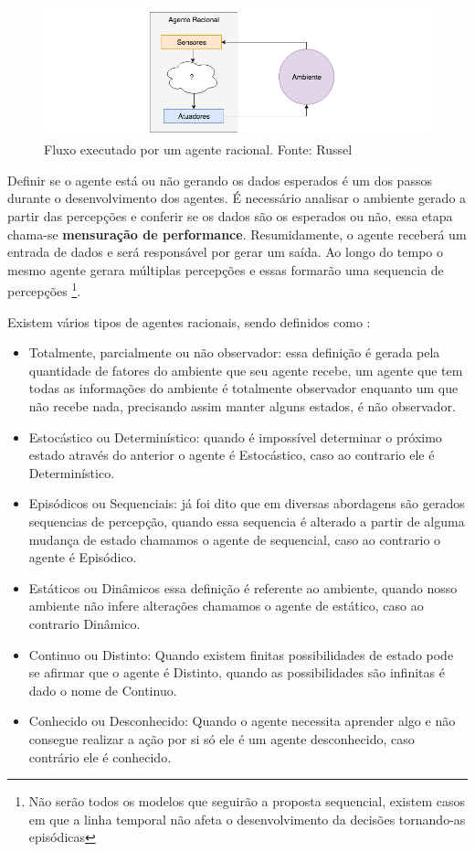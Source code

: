 \begin{figure}
    \centering
    \includegraphics[width=.8\textwidth]{imagens/rational_agent_draw.png}
    \caption{Fluxo executado por um agente racional. Fonte: Russel}
    \label{fig:rational_agent_draw}
\end{figure}

Definir se o agente está ou não gerando os dados esperados é um dos passos durante o desenvolvimento dos agentes. É necessário analisar o ambiente gerado a partir das percepções e conferir se os dados são os esperados ou não, essa etapa chama-se \textbf{mensuração de performance}. Resumidamente, o agente receberá um entrada de dados e será responsável por gerar um saída. Ao longo do tempo o mesmo agente gerara múltiplas percepções e essas formarão uma sequencia de percepções \footnote{Não serão todos os modelos que seguirão a proposta sequencial, existem casos em que a linha temporal não afeta o desenvolvimento da decisões tornando-as episódicas}.

Existem vários tipos de agentes racionais, sendo definidos como \cite[34-45]{russell2003artificial}:

\begin{itemize}
 \item Totalmente, parcialmente ou não observador: essa definição é gerada pela quantidade de fatores do ambiente que seu agente recebe, um agente que tem todas as informações do ambiente é totalmente observador enquanto um que não recebe nada, precisando assim manter alguns estados, é não observador.
 \item Estocástico ou Determinístico: quando é impossível determinar o próximo estado através do anterior o agente é Estocástico, caso ao contrario ele é Determinístico.
 \item Episódicos ou Sequenciais: já foi dito que em diversas abordagens são gerados sequencias de percepção, quando essa sequencia é alterado a partir de alguma mudança de estado chamamos o agente de sequencial, caso ao contrario o agente é Episódico.
 \item Estáticos ou Dinâmicos essa definição é referente ao ambiente, quando nosso ambiente não infere alterações chamamos o agente de estático, caso ao contrario Dinâmico.
 \item Continuo ou Distinto: Quando existem finitas possibilidades de estado pode se afirmar que o agente é Distinto, quando as possibilidades são infinitas é dado o nome de Continuo.
 \item Conhecido ou Desconhecido: Quando o agente necessita aprender algo e não consegue realizar a ação por si só ele é um agente desconhecido, caso contrário ele é conhecido.
\end{itemize}

